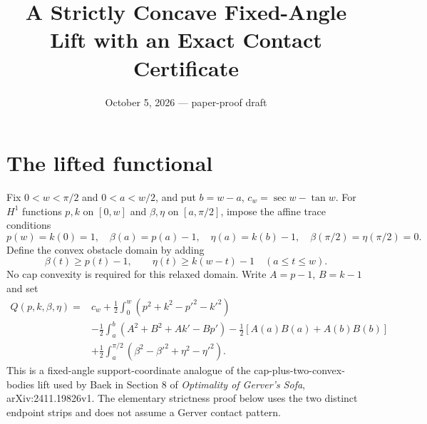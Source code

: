 \documentclass[11pt]{article}
\title{A Strictly Concave Fixed-Angle Lift with an Exact Contact Certificate}
\author{}\date{October 5, 2026 --- paper-proof draft}
\begin{document}
\maketitle

\section{The lifted functional}
Fix $0<w<\pi/2$ and $0<a<w/2$, and put $b=w-a$, $c_w=\sec w-\tan w$. For $H^1$ functions $p,k$ on $[0,w]$ and $\beta,\eta$ on $[a,\pi/2]$, impose the affine trace conditions
\[
 p(w)=k(0)=1,\quad \beta(a)=p(a)-1,\quad\eta(a)=k(b)-1,
 \quad\beta(\pi/2)=\eta(\pi/2)=0.
\]
Define the convex obstacle domain by adding
\[
 \beta(t)\ge p(t)-1,\qquad\eta(t)\ge k(w-t)-1\quad(a\le t\le w).
\]
No cap convexity is required for this relaxed domain. Write $A=p-1$, $B=k-1$ and set
\begin{align*}
 Q(p,k,\beta,\eta)={}&c_w+\frac12\int_0^w(p^2+k^2-p'^2-k'^2)\\
 &-\frac12\int_a^b(A^2+B^2+A k'-B p')
 -\frac12[A(a)B(a)+A(b)B(b)]\\
 &+\frac12\int_a^{\pi/2}(\beta^2-\beta'^2+\eta^2-\eta'^2).
\end{align*}
This is a fixed-angle support-coordinate analogue of the cap-plus-two-convex-bodies lift used by Baek in Section 8 of \emph{Optimality of Gerver's Sofa}, arXiv:2411.19826v1. The elementary strictness proof below uses the two distinct endpoint strips and does not assume a Gerver contact pattern.
\end{document}
